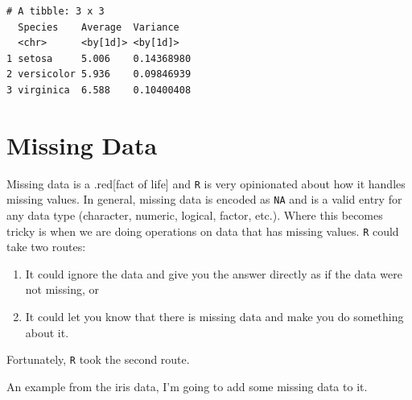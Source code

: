 \documentclass[
  letterpaper,
]{book}
\newenvironment{Shaded}{\begin{snugshade}}{\end{snugshade}}
\newcommand{\AttributeTok}[1]{\textcolor[rgb]{0.40,0.45,0.13}{#1}}
\newcommand{\ConstantTok}[1]{\textcolor[rgb]{0.56,0.35,0.01}{#1}}
\newcommand{\DecValTok}[1]{\textcolor[rgb]{0.68,0.00,0.00}{#1}}
\newcommand{\FunctionTok}[1]{\textcolor[rgb]{0.28,0.35,0.67}{#1}}
\newcommand{\NormalTok}[1]{\textcolor[rgb]{0.00,0.23,0.31}{#1}}
\newcommand{\OtherTok}[1]{\textcolor[rgb]{0.00,0.23,0.31}{#1}}
\newcommand{\SpecialCharTok}[1]{\textcolor[rgb]{0.37,0.37,0.37}{#1}}
\providecommand{\tightlist}{%
  \setlength{\itemsep}{0pt}\setlength{\parskip}{0pt}}
\begin{document}
\begin{Shaded}
\end{Shaded}

\begin{verbatim}
# A tibble: 3 x 3
  Species    Average  Variance  
  <chr>      <by[1d]> <by[1d]>  
1 setosa     5.006    0.14368980
2 versicolor 5.936    0.09846939
3 virginica  6.588    0.10400408
\end{verbatim}

\section{Missing Data}\label{missing-data-1}

Missing data is a .red{[}fact of life{]} and \texttt{R} is very
opinionated about how it handles missing values. In general, missing
data is encoded as \texttt{NA} and is a valid entry for any data type
(character, numeric, logical, factor, etc.). Where this becomes tricky
is when we are doing operations on data that has missing values.
\texttt{R} could take two routes:

\begin{enumerate}
\def\labelenumi{\arabic{enumi}.}
\tightlist
\item
  It could ignore the data and give you the answer directly as if the
  data were not missing, or\\
\item
  It could let you know that there is missing data and make you do
  something about it.
\end{enumerate}

Fortunately, \texttt{R} took the second route.

An example from the iris data, I'm going to add some missing data to it.

\begin{Shaded}
\end{Shaded}
\end{document}
